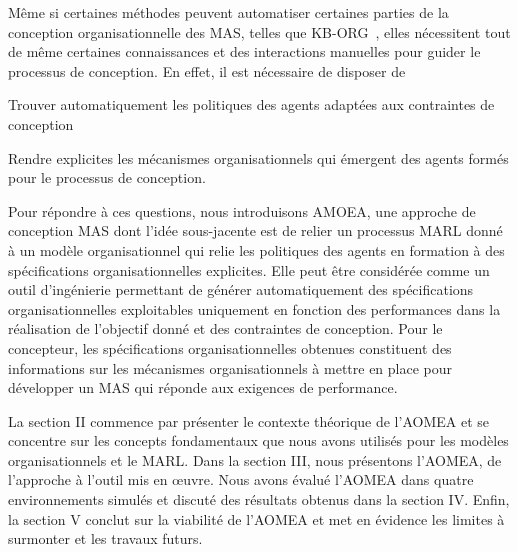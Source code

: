 Même si certaines méthodes peuvent automatiser certaines parties de la conception organisationnelle des MAS, telles que KB-ORG~\cite{Sims2008}, elles nécessitent tout de même certaines connaissances et des interactions manuelles pour guider le processus de conception. En effet, il est nécessaire de disposer de
\begin{enumerate*}[label=\roman*),itemjoin={; and \ }]
  \item Trouver automatiquement les politiques des agents adaptées aux contraintes de conception
  \item Rendre explicites les mécanismes organisationnels qui émergent des agents formés pour le processus de conception.
\end{enumerate*}


Pour répondre à ces questions, nous introduisons AMOEA, une approche de conception MAS dont l'idée sous-jacente est de relier un processus MARL donné à un modèle organisationnel qui relie les politiques des agents en formation à des spécifications organisationnelles explicites. Elle peut être considérée comme un outil d'ingénierie permettant de générer automatiquement des spécifications organisationnelles exploitables uniquement en fonction des performances dans la réalisation de l'objectif donné et des contraintes de conception. Pour le concepteur, les spécifications organisationnelles obtenues constituent des informations sur les mécanismes organisationnels à mettre en place pour développer un MAS qui réponde aux exigences de performance.



La section II commence par présenter le contexte théorique de l'AOMEA et se concentre sur les concepts fondamentaux que nous avons utilisés pour les modèles organisationnels et le MARL.
Dans la section III, nous présentons l'AOMEA, de l'approche à l'outil mis en œuvre. Nous avons évalué l'AOMEA dans quatre environnements simulés et discuté des résultats obtenus dans la section IV. Enfin, la section V conclut sur la viabilité de l'AOMEA et met en évidence les limites à surmonter et les travaux futurs.

